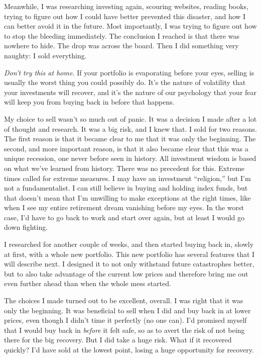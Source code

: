 Meanwhile, I was researching investing again, scouring websites, reading books, trying to figure out how I could have better prevented this disaster, and how I can better avoid it in the future. Most importantly, I was trying to figure out how to stop the bleeding immediately. The conclusion I reached is that there was nowhere to hide. The drop was across the board. Then I did something very naughty: I sold everything.

\emph{Don't try this at home.} If your portfolio is evaporating before your eyes, selling is usually the worst thing you could possibly do. It's the nature of volatility that your investments will recover, and it's the nature of our psychology that your fear will keep you from buying back in before that happens.

My choice to sell wasn't so much out of panic. It was a decision I made after a lot of thought and research. It was a big risk, and I knew that. I sold for two reasons. The first reason is that it became clear to me that it was only the beginning. The second, and more important reason, is that it also became clear that this was a unique recession, one never before seen in history. All investment wisdom is based on what we've learned from history. There was no precedent for this. Extreme times called for extreme measures. I may have an investment ``religion,'' but I'm not a fundamentalist. I can still believe in buying and holding index funds, but that doesn't mean that I'm unwilling to make exceptions at the right times, like when I see my entire retirement dream vanishing before my eyes. In the worst case, I'd have to go back to work and start over again, but at least I would go down fighting.

I researched for another couple of weeks, and then started buying back in, slowly at first, with a whole new portfolio. This new portfolio has several features that I will describe next. I designed it to not only withstand future catastrophes better, but to also take advantage of the current low prices and therefore bring me out even further ahead than when the whole mess started.

The choices I made turned out to be excellent, overall. I was right that it was only the beginning. It was beneficial to sell when I did and buy back in at lower prices, even though I didn't time it perfectly (no one can). I'd promised myself that I would buy back in \emph{before} it felt safe, so as to avert the risk of not being there for the big recovery. But I did take a huge risk. What if it recovered quickly? I'd have sold at the lowest point, losing a huge opportunity for recovery.

